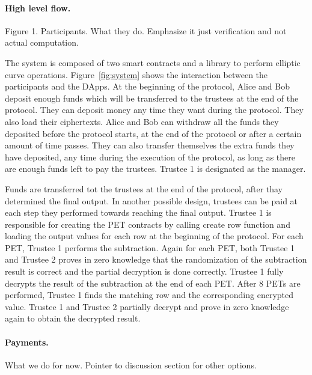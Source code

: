 
\paragraph{High level flow.} Figure 1. Participants. What they do. Emphasize it just verification and not actual computation. 

The system is composed of two smart contracts and a library to perform elliptic curve operations. Figure~\ref{fig:system} shows the interaction between the participants and the DApps. At the beginning of the protocol, Alice and Bob deposit enough funds which will be transferred to the trustees at the end of the protocol. They can deposit money any time they want during the protocol. They also load their ciphertexts. Alice and Bob can withdraw all the funds they deposited before the protocol starts, at the end of the protocol or after a certain amount of time passes. They can also transfer themselves the extra funds they have deposited, any time during the execution of the protocol, as long as there are enough funds left to pay the trustees. Trustee 1 is designated as the manager. 


Funds are transferred tot the trustees at the end of the protocol, after thay determined the final output. In another possible design, trustees can be paid at each step they performed towards reaching the final output.
Trustee 1 is responsible for creating the PET contracts by calling create row function and loading the output values for each row at the beginning of the protocol. For each PET, Trustee 1 performs the subtraction. Again for each PET, both Trustee 1 and Trustee 2 proves in zero knowledge that the randomization of the subtraction result is correct and the partial decryption is done correctly. Trustee 1 fully decrypts the result of the subtraction at the end of each PET. After 8 PETs are performed, Trustee 1 finds the matching row and the corresponding encrypted value. Trustee 1 and Trustee 2 partially decrypt and prove in zero knowledge again to obtain the decrypted result.


\paragraph{Payments.} What we do for now. Pointer to discussion section for other options. 

